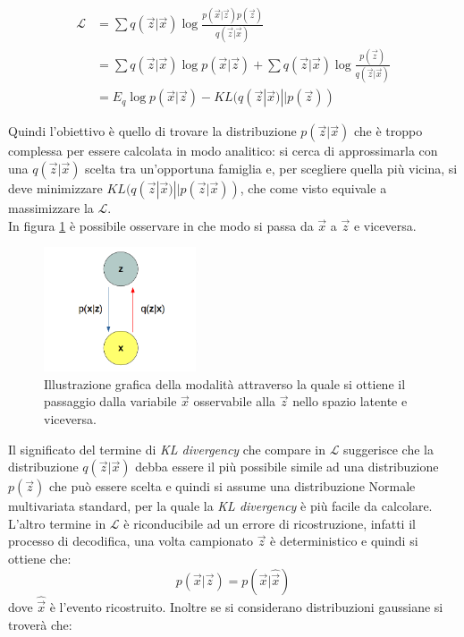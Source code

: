 \begin{equation}
\label{eq:lower_bound}
\begin{split}
	\mathcal{L} &= \sum q(\vec{z}|\vec{x}) \log \frac{p(\vec{x}|\vec{z})p(\vec{z})}{q(\vec{z}|\vec{x})} \\
	 &=\sum q(\vec{z}|\vec{x}) \log p(\vec{x}|\vec{z}) + \sum q(\vec{z}|\vec{x}) \log \frac{p(\vec{z})}{q(\vec{z}|\vec{x})} \\
	  &= E_{q}\log p(\vec{x}|\vec{z}) - KL (q(\vec{z}|\vec{x}) || p(\vec{z}))
\end{split}
\end{equation}

Quindi l'obiettivo è quello di trovare la distribuzione $p(\vec{z}|\vec{x})$ che è troppo complessa per essere calcolata in modo analitico: si cerca di approssimarla con una $q(\vec{z}|\vec{x})$ scelta tra un'opportuna famiglia e, per scegliere quella più vicina, si deve minimizzare $KL (q(\vec{z}|\vec{x}) || p(\vec{z}|\vec{x}))$, che come visto equivale a massimizzare la $\mathcal{L}$. \\
In figura \ref{grafo} è possibile osservare in che modo si passa da $\vec{x}$ a $\vec{z}$ e viceversa.

\newpage

\begin{figure}[h!]
	\centering		\includegraphics[width=0.40\textwidth]{figs/grafoVAE.png}
	\caption{Illustrazione grafica della modalità attraverso la quale si ottiene il passaggio dalla variabile $\vec{x}$ osservabile alla $\vec{z}$ nello spazio latente e viceversa.}
	\label{grafo}
\end{figure}

Il significato del termine di \textit{KL divergency} che compare in $\mathcal{L}$ suggerisce che la distribuzione $q(\vec{z}|\vec{x})$ debba essere il più possibile simile ad una distribuzione $p(\vec{z})$ che può essere scelta e quindi si assume una distribuzione Normale multivariata standard, per la quale la \textit{KL divergency} è più facile da calcolare. \\
L'altro termine in $\mathcal{L}$ è riconducibile ad un errore di ricostruzione, infatti il processo di decodifica, una volta campionato $\vec{z}$ è deterministico e quindi si ottiene che:
\begin{equation}
	p(\vec{x}|\vec{z}) = p(\vec{x}|\hat{\vec{x}})
\end{equation}
dove $\hat{\vec{x}}$ è l'evento ricostruito. Inoltre se si considerano distribuzioni gaussiane si troverà che:

